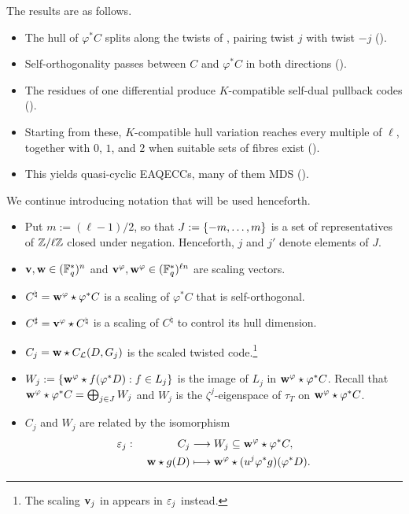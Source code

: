 \documentclass[twocolumn, 11pt]{scrartcl}
\begin{document}
The results are as follows.
\begin{itemize}
    \item The hull of $\varphi^*C$ splits along the twists of , pairing twist $j$ with twist $-j$ ().
    \item Self-orthogonality passes between $C$ and $\varphi^*C$ in both directions ().
    \item The residues of one differential produce $K$-compatible self-dual pullback codes ().
    \item Starting from these, $K$-compatible hull variation reaches every multiple of $\ell$, together with $0$, $1$, and $2$ when suitable sets of fibres exist ().
    \item This yields quasi-cyclic EAQECCs, many of them MDS ().
\end{itemize}

We continue introducing notation that will be used henceforth.
\begin{itemize}
    \item Put $m:=(\ell-1)/2$, so that $J:=\{-m,\hdots,m\}$ is a set of representatives of $\mathbb{Z}/\ell\mathbb{Z}$ closed under negation. Henceforth, $j$ and $j'$ denote elements of $J$.
    \item $\mathbf{v},\mathbf{w}\in(\mathbb{F}_q^*)^n$ and $\mathbf{v}^\varphi,\mathbf{w}^\varphi\in(\mathbb{F}_q^*)^{\ell n}$ are scaling vectors.
    \item $C^\natural=\mathbf{w}^\varphi\star\varphi^*C$ is a scaling of $\varphi^*C$ that is self-orthogonal.
    \item $C^\sharp=\mathbf{v}^\varphi\star C^\natural$ is a scaling of $C^\natural$ to control its hull dimension.
    \item $C_j=\mathbf{w}\star C_\mathcal{L}(D,G_j)$ is the scaled twisted code.\footnote{The scaling $\mathbf{v}_j$ in  appears in $\varepsilon_j$ instead.}
    \item $W_j:=\{\mathbf{w}^\varphi\star f(\varphi^*D):f\in L_j\}$ is the image of $L_j$ in $\mathbf{w}^\varphi\star\varphi^*C$. Recall that $\mathbf{w}^\varphi\star \varphi^*C=\bigoplus_{j\in J}W_j$ and $W_j$ is the $\zeta^j$-eigenspace of $\tau_T$ on $\mathbf{w}^\varphi\star\varphi^*C$.
    \item $C_j$ and $W_j$ are related by the isomorphism
        \begin{alignat*}{2}
        \varepsilon_j:\;&&C_j&\longrightarrow W_j\subseteq\mathbf{w}^\varphi\star\varphi^*C,\\
        &&\mathbf{w}\star g(D)&\longmapsto\mathbf{w}^\varphi\star(u^j\varphi^*g)(\varphi^*D).
        \end{alignat*}
\end{itemize}
\end{document}
